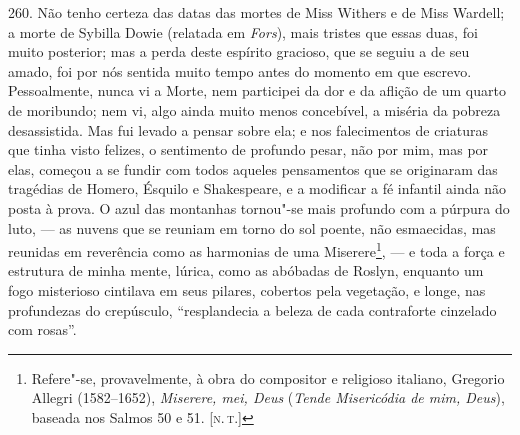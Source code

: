 260. Não tenho certeza das datas das mortes de Miss Withers e de Miss
Wardell; a morte de Sybilla Dowie (relatada em \emph{Fors}), mais
tristes que essas duas, foi muito posterior; mas a perda deste espírito
gracioso, que se seguiu a de seu amado, foi por nós sentida muito tempo
antes do momento em que escrevo. Pessoalmente, nunca vi a Morte, nem
participei da dor e da aflição de um quarto de moribundo; nem vi, algo
ainda muito menos concebível, a miséria da pobreza desassistida. Mas fui
levado a pensar sobre ela; e nos falecimentos de criaturas que tinha
visto felizes, o sentimento de profundo pesar, não por mim, mas por
elas, começou a se fundir com todos aqueles pensamentos que se
originaram das tragédias de Homero, Ésquilo e Shakespeare, e a modificar
a fé infantil ainda não posta à prova. O azul das montanhas tornou"-se
mais profundo com a púrpura do luto, --- as nuvens que se reuniam em
torno do sol poente, não esmaecidas, mas reunidas em reverência como as
harmonias de uma Miserere\footnote{Refere"-se, provavelmente, à obra do
  compositor e religioso italiano, Gregorio Allegri (1582--1652),
  \emph{Miserere, mei, Deus} (\emph{Tende Misericódia de mim, Deus}),
  baseada nos Salmos 50 e 51. {[}\textsc{n.\,t.}{]}}, --- e toda a força e
estrutura de minha mente, lúrica, como as abóbadas de Roslyn, enquanto
um fogo misterioso cintilava em seus pilares, cobertos pela vegetação, e
longe, nas profundezas do crepúsculo, ``resplandecia a beleza de cada
contraforte cinzelado com rosas''.
